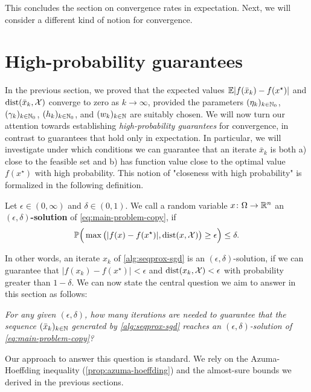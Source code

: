 This concludes the section on convergence rates in expectation. Next, we will consider a different kind of
notion for convergence.

\section{High-probability guarantees}
\label{sec:high-probability-bounds}

In the previous section, we proved
that the expected values
$\mathbb{E}|f(\bar{x}_k) - f(x^\star)|$ and $\operatorname{dist}(\bar{x}_k, \mathcal{X})$
converge to zero as $k\to\infty$, provided
the parameters $(\eta_k)_{k\in\mathbb{N}_0}$, $(\gamma_k)_{k\in\mathbb{N}_0}$, $(h_k)_{k\in\mathbb{N}_0}$,
and $(w_k)_{k\in\mathbb{N}}$ are suitably chosen.
We will now turn our attention towards establishing \textit{high-probability guarantees}
for convergence, in contrast
to guarantees that hold only in expectation. In particular, we will investigate under which
conditions we can guarantee that an iterate $\bar{x}_k$ is both a) close to the feasible set
and b) has function value close to the optimal value $f(x^\star)$ with high probability.
This notion of "closeness with high probability" is formalized in the following definition.
\begin{definition}
    Let $\epsilon\in(0,\infty)$ and $\delta\in(0, 1)$.
    We call a random variable $x\colon\Omega\to\mathbb{R}^n$ an \textbf{$(\epsilon, \delta)$-solution} of \eqref{eq:main-problem-copy},
    if
    \[
        \mathbb{P}\Big( \max\big( | f(x) - f(x^\star) |, \operatorname{dist}(x,\mathcal{X}) \big) \geq \epsilon \Big) \leq \delta.
    \]
\end{definition}
In other words, an iterate $x_k$ of \cref{alg:seqprox-sgd} is an $(\epsilon, \delta)$-solution, if we can guarantee that
$| f(x_k) - f(x^\star) | < \epsilon$ and $\operatorname{dist}(x_k, \mathcal{X}) < \epsilon$ with probability
greater than $1 - \delta$.
We can now state the central question we aim to answer in this section as follows:
\begin{list}{}
  {
    \leftmargin=5pt
    \rightmargin=5pt
    \itemsep=0pt
    \parsep=-2pt
  }
\item \textit{For any given $(\epsilon, \delta)$, how many iterations are needed
    to guarantee that the sequence $(\bar{x}_k)_{k\in\mathbb{N}}$
    generated by \cref{alg:seqprox-sgd} reaches an
    $(\epsilon, \delta)$-solution of \eqref{eq:main-problem-copy}?}
\end{list}
Our approach to answer this question is standard. We rely
on the Azuma-Hoeffding inequality (\cref{prop:azuma-hoeffding}) and
the almost-sure bounds we derived in the previous sections.

